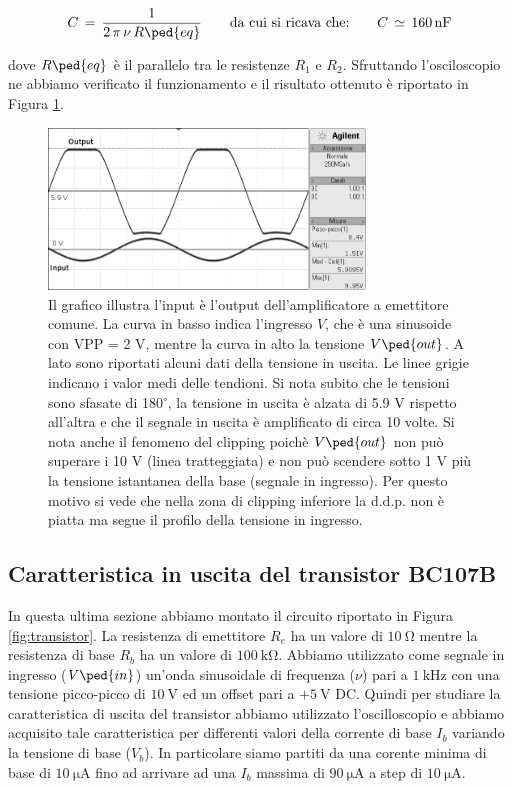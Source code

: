 \begin{equation}
	C \,=\, \frac{1}{2\,\pi\,\nu\,R\ped{eq}} \qquad\text{da cui si ricava che:}\qquad C \,\simeq\,\SI{160}{\nano\farad}
\end{equation}

dove $R\ped{eq}$ è il parallelo tra le resistenze $R_1$ e $R_2$.
Sfruttando l'osciloscopio ne abbiamo verificato il funzionamento e il risultato ottenuto è riportato in Figura \ref{fig:amp}.

\begin{figure}[t!]
	\centering
	\includegraphics[width=0.75\textwidth]{g.png}
	\caption{Il grafico illustra l'input è l'output dell'amplificatore a emettitore comune. La curva in basso indica l'ingresso $V$,
		che è una sinusoide con VPP = 2 V, mentre la curva in alto la tensione $V\ped{out}$. A lato sono riportati alcuni dati della tensione in uscita.
		Le linee grigie indicano i valor medi delle tendioni. Si nota subito che le tensioni sono
		sfasate di 180$^\circ$, la tensione in uscita è alzata di 5.9 V rispetto all'altra e che il segnale in uscita è amplificato di circa 10 volte.
		Si nota anche il fenomeno del clipping poichè $V\ped{out}$ non può superare i 10 V (linea tratteggiata) e non può scendere sotto 1 V più
		la tensione istantanea della base (segnale in ingresso). Per questo motivo si vede che nella zona di clipping inferiore la d.d.p.
		non è piatta ma segue il profilo della tensione in ingresso.}
	\label{fig:amp}
\end{figure}

\subsection*{Caratteristica in uscita del transistor BC107B}

In questa ultima sezione abbiamo montato il circuito riportato in Figura \ref{fig:transistor}. La resistenza di emettitore $R_e$ ha un valore di $\SI{10}{\ohm}$ mentre la resistenza di base $R_b$ ha un valore di $\SI{100}{\kilo\ohm}$. Abbiamo utilizzato come segnale in ingresso ($V\ped{in}$) un'onda sinusoidale di frequenza ($\nu$) pari a $\SI{1}{\kilo\hertz}$ con una tensione picco-picco di $\SI{10}{\volt}$ ed un offset pari a $+\SI{5}{\volt}$ DC.
Quindi per studiare la caratteristica di uscita del transistor abbiamo utilizzato l'oscilloscopio e abbiamo acquisito tale caratteristica per differenti valori della corrente di base $I_b$ variando la tensione di base ($V_b$). In particolare siamo partiti da una corente minima di base di $\SI{10}{\micro\ampere}$ fino ad arrivare ad una $I_b$ massima di $\SI{90}{\micro\ampere}$ a step di $\SI{10}{\micro\ampere}$.

